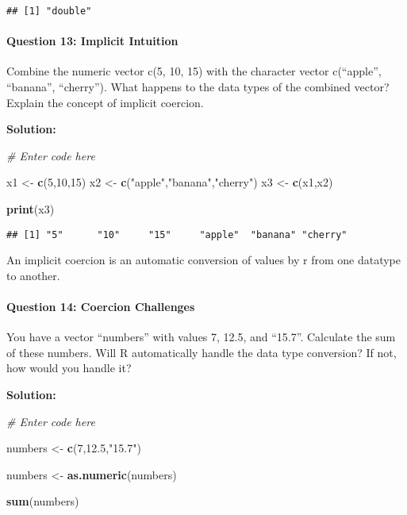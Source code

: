 \documentclass[
]{article}
\newenvironment{Shaded}{\begin{snugshade}}{\end{snugshade}}
\newcommand{\CommentTok}[1]{\textcolor[rgb]{0.56,0.35,0.01}{\textit{#1}}}
\newcommand{\DecValTok}[1]{\textcolor[rgb]{0.00,0.00,0.81}{#1}}
\newcommand{\FloatTok}[1]{\textcolor[rgb]{0.00,0.00,0.81}{#1}}
\newcommand{\FunctionTok}[1]{\textcolor[rgb]{0.13,0.29,0.53}{\textbf{#1}}}
\newcommand{\NormalTok}[1]{#1}
\newcommand{\OtherTok}[1]{\textcolor[rgb]{0.56,0.35,0.01}{#1}}
\newcommand{\StringTok}[1]{\textcolor[rgb]{0.31,0.60,0.02}{#1}}
\begin{document}
\begin{verbatim}
## [1] "double"
\end{verbatim}

\hypertarget{question-13-implicit-intuition}{%
\paragraph{Question 13: Implicit
Intuition}\label{question-13-implicit-intuition}}

Combine the numeric vector c(5, 10, 15) with the character vector
c(``apple'', ``banana'', ``cherry''). What happens to the data types of
the combined vector? Explain the concept of implicit coercion.

\textbf{Solution:}

\begin{Shaded}
\begin{Highlighting}[]
\CommentTok{\# Enter code here}

\NormalTok{x1 }\OtherTok{\textless{}{-}} \FunctionTok{c}\NormalTok{(}\DecValTok{5}\NormalTok{,}\DecValTok{10}\NormalTok{,}\DecValTok{15}\NormalTok{)}
\NormalTok{x2 }\OtherTok{\textless{}{-}} \FunctionTok{c}\NormalTok{(}\StringTok{"apple"}\NormalTok{,}\StringTok{"banana"}\NormalTok{,}\StringTok{"cherry"}\NormalTok{)}
\NormalTok{x3 }\OtherTok{\textless{}{-}} \FunctionTok{c}\NormalTok{(x1,x2)}

\FunctionTok{print}\NormalTok{(x3)}
\end{Highlighting}
\end{Shaded}

\begin{verbatim}
## [1] "5"      "10"     "15"     "apple"  "banana" "cherry"
\end{verbatim}

An implicit coercion is an automatic conversion of values by r from one
datatype to another.

\hypertarget{question-14-coercion-challenges}{%
\paragraph{Question 14: Coercion
Challenges}\label{question-14-coercion-challenges}}

You have a vector ``numbers'' with values 7, 12.5, and ``15.7''.
Calculate the sum of these numbers. Will R automatically handle the data
type conversion? If not, how would you handle it?

\textbf{Solution:}

\begin{Shaded}
\begin{Highlighting}[]
\CommentTok{\# Enter code here}

\NormalTok{numbers }\OtherTok{\textless{}{-}} \FunctionTok{c}\NormalTok{(}\DecValTok{7}\NormalTok{,}\FloatTok{12.5}\NormalTok{,}\StringTok{"15.7"}\NormalTok{)}

\NormalTok{numbers }\OtherTok{\textless{}{-}} \FunctionTok{as.numeric}\NormalTok{(numbers)}

\FunctionTok{sum}\NormalTok{(numbers)}
\end{Highlighting}
\end{Shaded}
\end{document}
